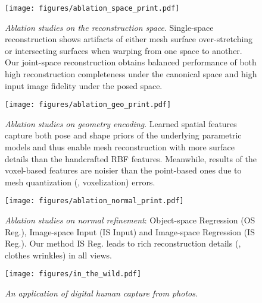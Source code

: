\documentclass[10pt,twocolumn,letterpaper]{article}
\newcommand{\beforefigcaption}{\vspace{-5mm}}
\newcommand{\afterfigcaption}{\vspace{-5mm}}
\begin{document}
\begin{figure}[ptb]
\vspace{-1mm}
\centering
\texttt{[image: figures/ablation\_space\_print.pdf]}
\beforefigcaption
\vspace{1mm}
\caption{\textit{Ablation studies on the reconstruction space}. Single-space reconstruction shows artifacts of either mesh surface over-stretching or intersecting surfaces when warping from one space to another. Our joint-space reconstruction obtains balanced performance of both high reconstruction completeness under the canonical space and high input image fidelity under the posed space.
}
\afterfigcaption
\vspace{1mm}
\label{fig:ablation_space}
\end{figure}

\begin{figure}[ptb]
\centering
\texttt{[image: figures/ablation\_geo\_print.pdf]}
\beforefigcaption
\caption{\textit{Ablation studies on geometry encoding}. Learned spatial features capture both pose and shape priors of the underlying parametric models and thus enable mesh reconstruction with more surface details than the handcrafted RBF features. Meanwhile, results of the voxel-based features are noisier than the point-based ones due to mesh quantization (\ie, voxelization) errors.}
\afterfigcaption
\vspace{1mm}
\label{fig:ablation_geo}
\end{figure}

\begin{figure}[ptb]
\centering
\texttt{[image: figures/ablation\_normal\_print.pdf]}
\beforefigcaption
\caption{\textit{Ablation studies on normal refinement}: Object-space Regression (OS Reg.), Image-space Input (IS Input) and Image-space Regression (IS Reg.). Our method IS Reg. leads to rich reconstruction details (\eg, clothes wrinkles) in all views.
}
\afterfigcaption
\vspace{1mm}
\label{fig:ablation_normal}
\end{figure}

\begin{figure}[ptb]
\vspace{-1mm}
\centering
\texttt{[image: figures/in\_the\_wild.pdf]}
\beforefigcaption
\caption{\textit{An application of digital human capture from photos}.}
\afterfigcaption
\label{fig:in_the_wild}
\end{figure}
\end{document}
